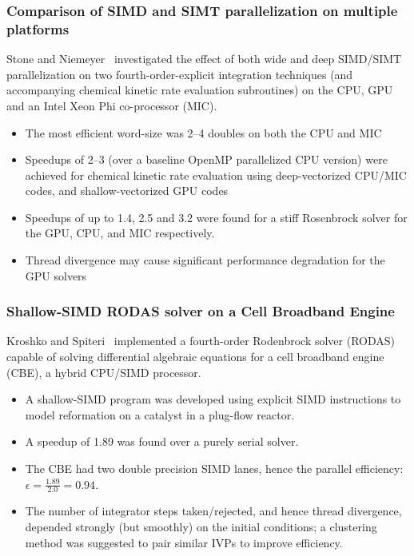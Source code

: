 \documentclass{beamer}
\begin{document}
\begin{frame}
 \frametitle{Comparison of SIMD and SIMT parallelization on multiple platforms}
 Stone and Niemeyer~ investigated the effect of both wide and deep SIMD\slash SIMT parallelization on two fourth-order-explicit integration techniques (and accompanying chemical kinetic rate evaluation subroutines) on the CPU, GPU and an Intel Xeon Phi co-processor (MIC).
 \begin{itemize}
  \item The most efficient word-size was 2--4 doubles on both the CPU and MIC
  \item Speedups of \SIrange[range-phrase=--, range-units = single]{2}{3}{\times} (over a baseline OpenMP parallelized CPU version) were achieved for chemical kinetic rate evaluation using deep-vectorized CPU\slash MIC codes, and shallow-vectorized GPU codes
  \item Speedups of up to \SI{1.4}{\times}, \SI{2.5}{\times} and \SI{3.2}{\times} were found for a stiff Rosenbrock solver for the GPU, CPU, and MIC respectively.
  \item Thread divergence may cause significant performance degradation for the GPU solvers
 \end{itemize}
\end{frame}

\begin{frame}
 \frametitle{Shallow-SIMD RODAS solver on a Cell Broadband Engine}
 Kroshko and Spiteri~ implemented a fourth-order Rodenbrock solver (RODAS) capable of solving differential algebraic equations for a cell broadband engine (CBE), a hybrid CPU\slash SIMD processor.
 \begin{itemize}
  \item A shallow-SIMD program was developed using explicit SIMD instructions to model  reformation on a  catalyst in a plug-flow reactor.
  \item A speedup of \SI{1.89}{\times} was found over a purely serial solver.
  \item The CBE had two double precision SIMD lanes, hence the parallel efficiency: $\epsilon = \frac{1.89}{2.0} = 0.94$.
  \item The number of integrator steps taken\slash rejected, and hence thread divergence, depended strongly (but smoothly) on the initial conditions; a clustering method was suggested to pair similar IVPs to improve efficiency.
 \end{itemize}
\end{frame}
\end{document}
